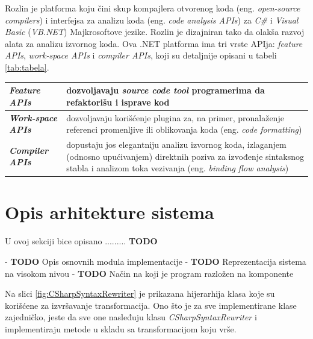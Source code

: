 \documentclass[a4paper]{article}
\begin{document}
{Rozlin je platforma koju čini skup kompajlera otvorenog koda (eng. \textit{open-source compilers}) i interfejsa za analizu koda (eng. \textit{code analysis APIs}) za \textit{C\#} i \textit{Visual Basic} (\textit{VB.NET}) Majkrosoftove jezike. Rozlin je dizajniran tako da olakša razvoj alata za analizu izvornog koda. Ova .NET platforma ima tri vrste APIja: \textit{feature APIs}, \textit{work-space APIs} i \textit{compiler APIs}, koji su detaljnije opisani u tabeli \ref{tab:tabela}.

\begin{center}
\label{tab:tabela} %
\begin{tabular}{ | m{3cm} | m{6cm} | } 
 \hline
  \textbf{\textit{Feature APIs}} & dozvoljavaju \textit{source code tool} programerima da refaktorišu i isprave kod  \\ 
  \hline
  \textbf{\textit{Work-space APIs}} & dozvoljavaju korišćenje plugina za, na primer, pronalaženje referenci promenljive ili oblikovanja koda (eng. \textit{code formatting})  \\ 
  \hline
  \textbf{\textit{Compiler APIs}} & dopustaju jos elegantniju analizu izvornog koda, izlaganjem (odnosno upućivanjem) direktnih poziva za izvođenje sintaksnog stabla i analizom toka vezivanja (eng. \textit{binding flow analysis})  \\ 
  \hline
\end{tabular}
\end{center}



\section{Opis arhitekture sistema}
\label{sec:opis_arhitekture_sistema}

U ovoj sekciji bice opisano ......... \textbf{TODO}

\hfill

- \textbf{TODO} Opis osnovnih modula implementacije
- \textbf{TODO} Reprezentacija sistema na visokom nivou
- \textbf{TODO} Način na koji je program razložen na komponente

\hfill

Na slici \ref{fig:CSharpSyntaxRewriter} je prikazana hijerarhija klasa koje su korišćene za izvršavanje transformacija. Ono što je za sve implementirane klase zajedničko, jeste da sve one nasleđuju klasu \textit{CSharpSyntaxRewriter} i implementiraju metode u skladu sa transformacijom koju vrše.

}
\end{document}
